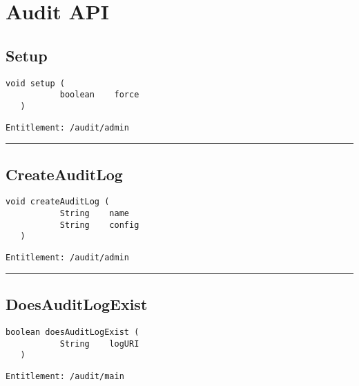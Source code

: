 \chapter{Audit API}

\section{Setup}
\label{Api:Setup}
\begin{lstlisting}[style=nonumbers]
   void setup (
           boolean    force
   )
\end{lstlisting}
\begin{Verbatim}[formatcom=\color{Maroon}]
  Entitlement: /audit/admin
\end{Verbatim}



\rule{12cm}{2pt}
\section{CreateAuditLog}
\label{Api:CreateAuditLog}
\begin{lstlisting}[style=nonumbers]
   void createAuditLog (
           String    name
           String    config
   )
\end{lstlisting}
\begin{Verbatim}[formatcom=\color{Maroon}]
  Entitlement: /audit/admin
\end{Verbatim}



\rule{12cm}{2pt}
\section{DoesAuditLogExist}
\label{Api:DoesAuditLogExist}
\begin{lstlisting}[style=nonumbers]
   boolean doesAuditLogExist (
           String    logURI
   )
\end{lstlisting}
\begin{Verbatim}[formatcom=\color{Maroon}]
  Entitlement: /audit/main
\end{Verbatim}



